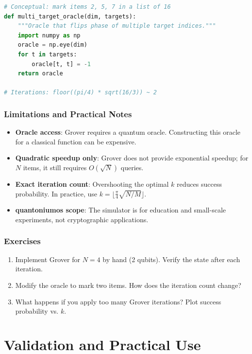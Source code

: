 \documentclass[11pt, a4paper, openany]{book}
\theoremstyle{definition}
\begin{document}
\begin{lstlisting}[language=Python, caption={Grover with Multiple Targets}]
# Conceptual: mark items 2, 5, 7 in a list of 16
def multi_target_oracle(dim, targets):
    """Oracle that flips phase of multiple target indices."""
    import numpy as np
    oracle = np.eye(dim)
    for t in targets:
        oracle[t, t] = -1
    return oracle

# Iterations: floor((pi/4) * sqrt(16/3)) ~ 2
\end{lstlisting}

\section{Limitations and Practical Notes}
\begin{itemize}
    \item \textbf{Oracle access}: Grover requires a quantum oracle. Constructing this oracle for a classical function can be expensive.
    \item \textbf{Quadratic speedup only}: Grover does not provide exponential speedup; for $N$ items, it still requires $O(\sqrt{N})$ queries.
    \item \textbf{Exact iteration count}: Overshooting the optimal $k$ reduces success probability. In practice, use $k = \lfloor \frac{\pi}{4}\sqrt{N/M} \rfloor$.
    \item \textbf{quantoniumos scope}: The simulator is for education and small-scale experiments, not cryptographic applications.
\end{itemize}

\section{Exercises}
\begin{enumerate}
    \item Implement Grover for $N=4$ by hand (2 qubits). Verify the state after each iteration.
    \item Modify the oracle to mark two items. How does the iteration count change?
    \item What happens if you apply too many Grover iterations? Plot success probability vs. $k$.
\end{enumerate}

\part{Validation and Practical Use}
\end{document}
